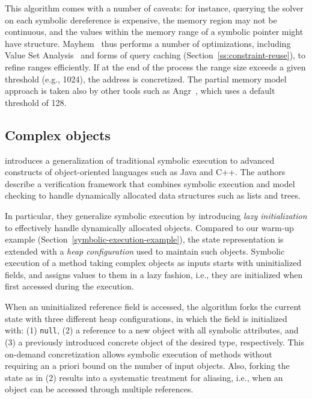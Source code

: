 This algorithm comes with a number of caveats: for instance, querying the solver on each symbolic dereference is expensive, the memory region may not be continuous, and the values within the memory range of a symbolic pointer might have structure. {\sc Mayhem}~\cite{MAYHEM-SP12} thus performs a number of optimizations, including Value Set Analysis~\cite{VSA-CC04} and forms of query caching (Section~\ref{ss:constraint-reuse}), to refine ranges efficiently. If at the end of the process the range size exceeds a given threshold (e.g., 1024), the address is concretized. The partial memory model approach is taken also by other tools such as {\sc Angr}~\cite{ANGR-SSP16}, which uses a default threshold of 128. %

\subsection{Complex objects}
\label{ss:complex-objects}

\cite{KPV-TACAS03} introduces a generalization of traditional symbolic execution to advanced constructs of object-oriented languages such as Java and C++. The authors describe a verification framework that combines symbolic execution and model checking to handle dynamically allocated data structures such as lists and trees. %

In particular, they generalize symbolic execution by introducing {\em lazy initialization} to effectively handle dynamically allocated objects. Compared to our warm-up example (Section~\ref{symbolic-execution-example}), the state representation is extended with a {\em heap configuration} used to maintain such objects. Symbolic execution of a method taking complex objects as inputs starts with uninitialized fields, and assigns values to them in a lazy fashion, i.e., they are initialized when first accessed during the execution.

When an uninitialized reference field is accessed, the algorithm forks the current state with three different heap configurations, in which the field is initialized with: (1) {\tt null}, (2) a reference to a new object with all symbolic attributes, and (3) a previously introduced concrete object of the desired type, respectively. This on-demand concretization allows symbolic execution of methods without requiring an a priori bound on the number of input objects. Also, forking the state as in (2) results into a systematic treatment for aliasing, i.e., when an object can be accessed through multiple references.

